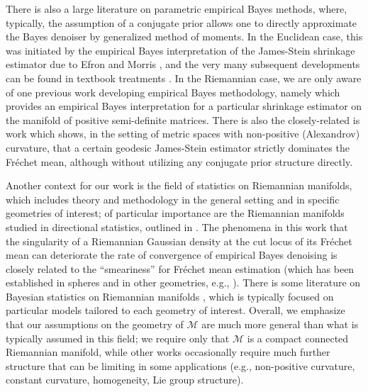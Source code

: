\documentclass[preprint]{imsart}
\theoremstyle{plain}
\theoremstyle{definition}
\newcommand{\Mcal}{\mathcal{M}}
\begin{document}
There is also a large literature on parametric empirical Bayes methods, where, typically, the assumption of a conjugate prior allows one to directly approximate the Bayes denoiser by generalized method of moments.
In the Euclidean case, this was initiated by the empirical Bayes interpretation of the James-Stein shrinkage estimator due to Efron and Morris \cite{EfronMorris1973}, and the very many subsequent developments can be found in textbook treatments \cite{CarlinLouis, Maritz}.
In the Riemannian case, we are only aware of one previous work developing empirical Bayes methodology, namely \cite{YangDossVemuri} which provides an empirical Bayes interpretation for a particular shrinkage estimator on the manifold of positive semi-definite matrices.
There is also the closely-related is work \cite{SteinFrechet} which shows, in the setting of metric spaces with non-positive (Alexandrov) curvature, that a certain geodesic James-Stein estimator strictly dominates the Fr\'echet mean, although without utilizing any conjugate prior structure directly.

Another context for our work is the field of statistics on Riemannian manifolds, which includes theory and methodology in the general setting \cite{ManifoldsI, ManifoldsII,GeomStats} and in specific geometries of interest; of particular importance are the Riemannian manifolds studied in directional statistics, outlined in \cite{JuppMardia}.
The phenomena in this work that the singularity of a Riemannian Gaussian density at the cut locus of its Fr\'echet mean can deteriorate the rate of convergence of empirical Bayes denoising is closely related to the ``smeariness'' for Fr\'echet mean estimation (which has been established in spheres \cite{HotzHuckemann} and in other geometries, e.g., \cite{EltznerHuckemann,HundrieserEltznerHuckemann}).
There is some literature on Bayesian statistics on Riemannian manifolds \cite{BhattacharyaDunsonI, BhattacharyaDunsonII, RiemannianBayesianDTI}, which is typically focused on particular models tailored to each geometry of interest.
Overall, we emphasize that our assumptions on the geometry of $\Mcal$ are much more general than what is typically assumed in this field; we require only that $\Mcal$ is a compact connected Riemannian manifold, while other works occasionally require much further structure that can be limiting in some applications (e.g., non-positive curvature, constant curvature, homogeneity, Lie group structure).
\end{document}
